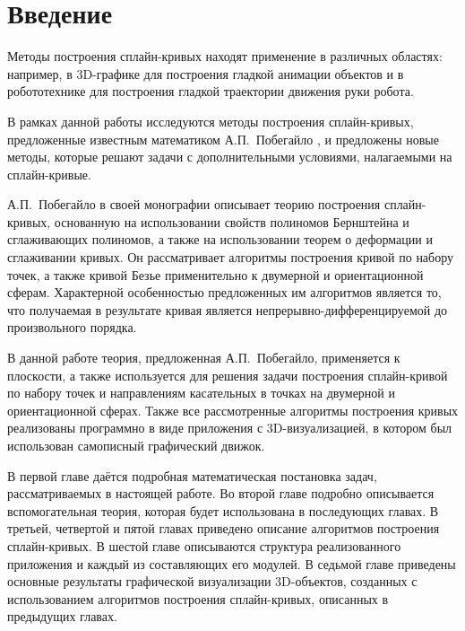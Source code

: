 \chapter*{Введение}

Методы построения сплайн-кривых находят применение в различных областях: например, в 3D-графике для построения гладкой
анимации объектов и в робототехнике для построения гладкой траектории движения руки робота.

В рамках данной работы исследуются методы построения сплайн-кривых, предложенные известным математиком
А.П.~Побегайло \cite{pobegaylo}, и предложены новые методы, которые решают задачи с дополнительными условиями,
налагаемыми на сплайн-кривые.

А.П.~Побегайло в своей монографии описывает теорию построения сплайн-кривых, основанную на
использовании свойств полиномов Бернштейна и сглаживающих полиномов, а также на использовании теорем о деформации и
сглаживании кривых. Он рассматривает алгоритмы построения кривой по набору точек, а также кривой Безье применительно
к двумерной и ориентационной сферам. Характерной особенностью предложенных им алгоритмов является то, что получаемая
в результате кривая является непрерывно-дифференцируемой до произвольного порядка.

В данной работе теория, предложенная А.П.~Побегайло, применяется к плоскости, а также используется для
решения задачи построения сплайн-кривой по набору точек и направлениям касательных в точках на двумерной и
ориентационной сферах. Также все рассмотренные алгоритмы построения кривых реализованы программно в виде
приложения с 3D-визуализацией, в котором был использован самописный графический движок.

В первой главе даётся подробная математическая постановка задач, рассматриваемых в настоящей работе. Во второй главе
подробно описывается вспомогательная теория, которая будет использована в последующих главах. В третьей, четвертой и
пятой главах приведено описание алгоритмов построения сплайн-кривых. В шестой главе описываются структура
реализованного приложения и каждый из составляющих его модулей. В седьмой главе приведены основные результаты
графической визуализации 3D-объектов, созданных с использованием алгоритмов построения сплайн-кривых,
описанных в предыдущих главах.
